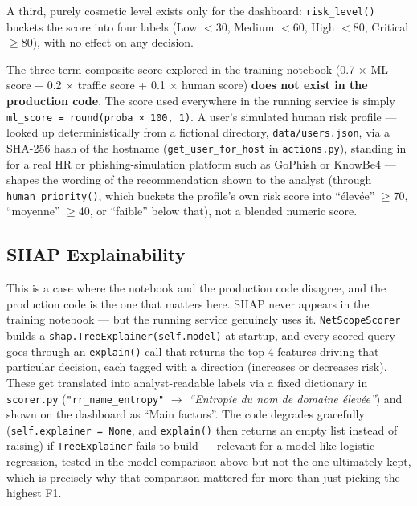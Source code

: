 \documentclass[12pt,a4paper]{report}
\begin{document}
A third, purely cosmetic level exists only for the dashboard: \texttt{risk\_level()} buckets the score into four labels (Low $<$30, Medium $<$60, High $<$80, Critical $\geq$80), with no effect on any decision.

The three-term composite score explored in the training notebook (0.7 × ML score + 0.2 × traffic score + 0.1 × human score) \textbf{does not exist in the production code}. The score used everywhere in the running service is simply \texttt{ml\_score = round(proba × 100, 1)}. A user's simulated human risk profile --- looked up deterministically from a fictional directory, \texttt{data/users.json}, via a SHA-256 hash of the hostname (\texttt{get\_user\_for\_host} in \texttt{actions.py}), standing in for a real HR or phishing-simulation platform such as GoPhish or KnowBe4 --- shapes the wording of the recommendation shown to the analyst (through \texttt{human\_priority()}, which buckets the profile's own risk score into ``élevée'' $\geq$70, ``moyenne'' $\geq$40, or ``faible'' below that), not a blended numeric score.

\subsection*{SHAP Explainability}
This is a case where the notebook and the production code disagree, and the production code is the one that matters here. SHAP never appears in the training notebook --- but the running service genuinely uses it. \texttt{NetScopeScorer} builds a \texttt{shap.TreeExplainer(self.model)} at startup, and every scored query goes through an \texttt{explain()} call that returns the top 4 features driving that particular decision, each tagged with a direction (increases or decreases risk). These get translated into analyst-readable labels via a fixed dictionary in \texttt{scorer.py} (\texttt{"rr\_name\_entropy"} $\rightarrow$ \emph{``Entropie du nom de domaine élevée''}) and shown on the dashboard as ``Main factors''. The code degrades gracefully (\texttt{self.explainer = None}, and \texttt{explain()} then returns an empty list instead of raising) if \texttt{TreeExplainer} fails to build --- relevant for a model like logistic regression, tested in the model comparison above but not the one ultimately kept, which is precisely why that comparison mattered for more than just picking the highest F1.
\end{document}
